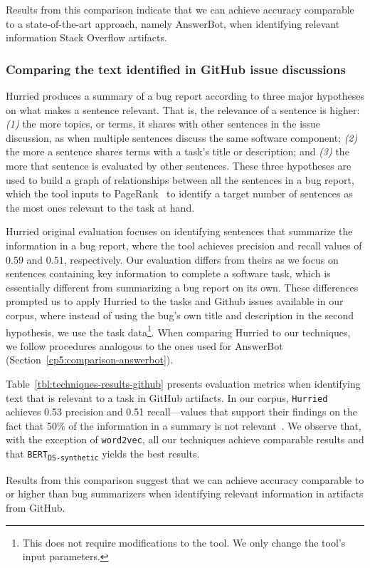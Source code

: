 Results from this comparison indicate that we can achieve accuracy comparable  
to a state-of-the-art approach, namely AnswerBot, 
when identifying relevant information Stack Overflow artifacts.






\subsubsection{Comparing the text identified in GitHub issue discussions}
\label{cp5:comparison-hurried}


\acs{Hurried} produces a summary of a bug report according to three major hypotheses on what makes a sentence relevant. 
That is, the relevance of a sentence is higher:
\textit{(1)} the more topics, or terms, it shares with other sentences  in the issue discussion, as when multiple sentences discuss the same software component;
\textit{(2)} the more a sentence shares terms with a task's title or description; and 
\textit{(3)} the more that sentence is evaluated by other sentences.
These three hypotheses are used to build a graph of relationships between all the sentences in a bug report, which 
the tool inputs to PageRank~\cite{Page1999} to identify a target number of sentences as the most 
ones relevant to the task at hand. 



\acs{Hurried} original evaluation focuses on identifying sentences that summarize the information in a bug report, where the tool achieves precision and recall values of $0.59$ and $0.51$, respectively.
Our evaluation differs from theirs as we focus on sentences containing key information to complete a software task, which is essentially different from summarizing a bug report on its own. These differences prompted us to apply \acs{Hurried} to the tasks and Github issues available in our corpus, where instead of using the bug's own title and description in the second hypothesis, we use the task data\footnote{This does not require modifications to the tool. We only change the tool's input parameters.}. When comparing \acs{Hurried} to our techniques, we follow procedures analogous to the ones used for AnswerBot (Section~\ref{cp5:comparison-answerbot}).



Table~\ref{tbl:techniques-results-github} presents evaluation metrics when identifying text that is relevant to a task 
in GitHub artifacts. In our corpus, \texttt{Hurried} achieves 0.53 precision and 0.51 recall---values that support their findings on the fact that 50\% of the information in a summary is not relevant~\cite{Lotufo2012}.
We observe that, with the exception of \texttt{word2vec}, all our techniques achieve comparable results
and that \texttt{BERT\textsubscript{DS-synthetic}} yields the best results. 








Results from this comparison suggest that we can achieve accuracy comparable to or higher than 
bug summarizers when identifying relevant information in artifacts from GitHub.





